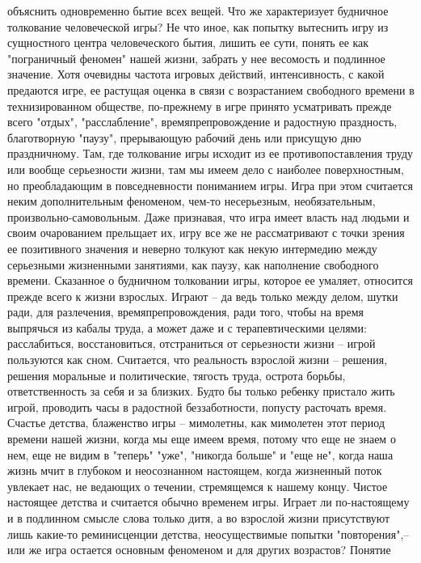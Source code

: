 \documentclass[12pt]{article}
\begin{document}
объяснить одновременно бытие всех вещей.
Что же характеризует будничное толкование человеческой игры? Не что иное, как попытку вытеснить игру из
сущностного центра человеческого бытия, лишить ее сути, понять ее как "пограничный феномен" нашей жизни,
забрать у нее весомость и подлинное значение. Хотя очевидны частота игровых действий, интенсивность, с
какой предаются игре, ее растущая оценка в связи с возрастанием свободного времени в технизированном
обществе,  по-прежнему  в  игре  принято  усматривать  прежде  всего  "отдых",  "расслабление",
времяпрепровождение  и  радостную  праздность,  благотворную  "паузу",  прерывающую  рабочий  день  или
присущую дню праздничному. Там, где толкование игры исходит из ее противопоставления труду или вообще
серьезности жизни, там мы имеем дело с наиболее поверхностным, но преобладающим в повседневности
пониманием  игры.  Игра  при  этом  считается  неким  дополнительным  феноменом,  чем-то  несерьезным,
необязательным,  произвольно-самовольным.  Даже  признавая,  что  игра  имеет  власть  над  людьми  и  своим
очарованием прельщает их, игру все же не рассматривают с точки зрения ее позитивного значения и неверно
толкуют  как  некую  интермедию  между  серьезными  жизненными  занятиями,  как  паузу,  как  наполнение
свободного времени. Сказанное о будничном толковании игры, которое ее умаляет, относится прежде всего к
жизни взрослых. Играют -- да ведь только между делом, шутки ради, для разлечения, времяпрепровождения,
ради  того,  чтобы  на  время  выпрячься  из  кабалы  труда,  а  может  даже  и  с  терапевтическими  целями:
расслабиться, восстановиться, отстраниться от серьезности жизни -- игрой пользуются как сном. Считается, что
реальность взрослой жизни -- решения, решения моральные и политические, тягость труда, острота борьбы,
ответственность  за  себя  и  за  близких.  Будто  бы  только  ребенку  пристало  жить  игрой,  проводить  часы  в
радостной  беззаботности,  попусту  расточать  время.  Счастье  детства,  блаженство  игры  --  мимолетны,  как
мимолетен этот период времени нашей жизни, когда мы еще имеем время, потому что еще не знаем о нем, еще
не видим в "теперь" "уже", "никогда больше" и "еще не", когда наша жизнь мчит в глубоком и неосознанном
настоящем, когда жизненный поток увлекает нас, не ведающих о течении, стремящемся к нашему концу. Чистое
настоящее детства и считается обычно временем игры. Играет ли по-настоящему и в подлинном смысле слова
только  дитя,  а  во  взрослой  жизни  присутствуют  лишь  какие-то  реминисценции  детства,  неосуществимые
попытки  "повторения",--  или  же  игра  остается  основным  феноменом  и  для  других  возрастов?  Понятие
\end{document}
